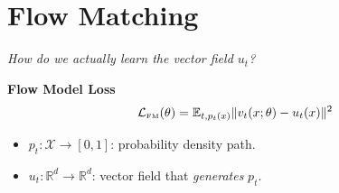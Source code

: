\documentclass{beamer}
\begin{document}
\section{Flow Matching}
\begin{frame}
    \begin{center}
        \emph{How do we actually learn the vector field \( u_t \)?}
    \end{center}
\end{frame}
\begin{frame}
    \begin{blackblock}
        \textbf{Flow Model Loss}
        \[ \mathcal{L}_{\text{\tiny FM}}(\theta) = \mathbb{E}_{t, p_t(x)} \|v_{t}(x; \theta) - u_t(x)\|^2 \]
    \end{blackblock}
    \begin{itemize}
        \item \( p_t : \mathcal{X} \to [0, 1] \): probability density path.
        \item \( u_t : \mathbb{R}^d \to \mathbb{R}^d \): vector field that \emph{generates} \( p_t \).
    \end{itemize}
    \vspace*{.5cm}
\end{frame}
\end{document}
